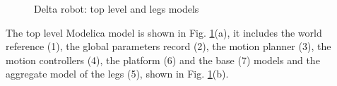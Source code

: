 \documentclass[]{interact}
\theoremstyle{plain}%
\theoremstyle{definition}
\theoremstyle{remark}
\begin{document}
\begin{figure}
\centering
{}
\caption{Delta robot: top level and legs models} \label{Fig:Delta_robot_Modelica_top_level}
\end{figure}
The top level Modelica model is shown in Fig. \ref{Fig:Delta_robot_Modelica_top_level}(a), it includes the world reference (1), the global parameters record (2), the motion planner (3), the motion controllers (4), the platform (6) and the base (7) models and the aggregate model of the legs (5), shown in Fig. \ref{Fig:Delta_robot_Modelica_top_level}(b).
\end{document}
